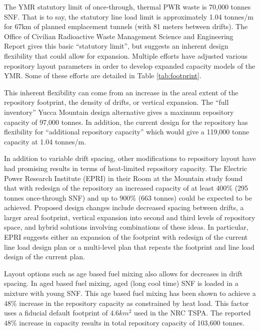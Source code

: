 The \gls{YMR} statutory limit of once-through, thermal PWR waste is 70,000 tonnes 
SNF.  That is to say, the statutory line load limit is approximately 1.04 tonnes/m
for 67km of planned emplacement tunnels (with 81 meters between drifts). The
Office of Civilian Radioactive Waste Management Science and Engineering Report
gives this basic ``statutory limit'', but suggests an inherent design
flexibility that could allow for expansion. Multiple efforts have adjusted 
various repository layout parameters in order to develop expanded capacity 
models of the \gls{YMR}. Some of these efforts are detailed in Table 
\ref{tab:footprint}.

 

This inherent flexibility can come from an increase in the areal extent of the 
repository footprint, the density of drifts, or vertical expansion. The  ``full inventory'' Yucca
Mountain design alternative gives a maximum repository capacity of 97,000
tonnes. In addition, the current design for the repository has flexibility for
``additional repository capacity'' which would give a 119,000 tonne capacity at
1.04 tonnes/m.\cite{doe_yucca_2002} 

In addition to variable drift spacing, other modifications to repository layout
have had promising results in terms of heat-limited repository capacity. The
Electric Power Research Institute (EPRI) in their Room at the Mountain study
found that with redesign of the repository an increased capacity of at least
$400\%$ (295 tonnes once-through SNF) and up to $900\%$ (663 tonnes) could be
expected to be achieved. Proposed design changes include decreased spacing
between drifts, a larger areal footprint, vertical expansion into second and
third levels of repository space, and hybrid solutions involving combinations
of these ideas. In particular, EPRI suggests either an expansion of the
footprint with redesign of the current line load design plan or a
multi-level plan that repeats the footprint and line load design of the current
plan\cite{kessler_room_2006}.


Layout options such as age based fuel mixing also allows for decreases in drift 
spacing. In aged based fuel mixing, aged (long cool time) SNF is loaded in a 
mixture with young SNF. This age based fuel mixing has been shown to achieve a 
$48\%$ increase in the repository capacity as constrained by heat
load\cite{nicholson_thermal_2007}. This factor uses a fiducial default
footprint of $4.6 km^2$ used in the NRC TSPA.  The reported $48\%$ increase in
capacity results in total repository capacity of 103,600
tonnes\cite{williams_total_2001}.




